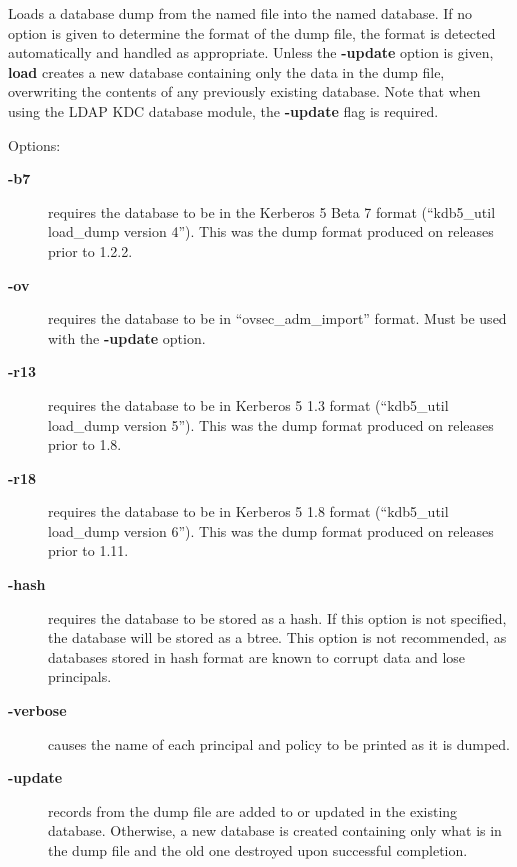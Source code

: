 \documentclass[letterpaper,10pt,english]{sphinxmanual}
\begin{document}
Loads a database dump from the named file into the named database.  If
no option is given to determine the format of the dump file, the
format is detected automatically and handled as appropriate.  Unless
the \textbf{-update} option is given, \textbf{load} creates a new database
containing only the data in the dump file, overwriting the contents of
any previously existing database.  Note that when using the LDAP KDC
database module, the \textbf{-update} flag is required.

Options:
\begin{description}
\item[{\textbf{-b7}}] \leavevmode
requires the database to be in the Kerberos 5 Beta 7 format
(``kdb5\_util load\_dump version 4'').  This was the dump format
produced on releases prior to 1.2.2.

\item[{\textbf{-ov}}] \leavevmode
requires the database to be in ``ovsec\_adm\_import'' format.  Must be
used with the \textbf{-update} option.

\item[{\textbf{-r13}}] \leavevmode
requires the database to be in Kerberos 5 1.3 format (``kdb5\_util
load\_dump version 5'').  This was the dump format produced on
releases prior to 1.8.

\item[{\textbf{-r18}}] \leavevmode
requires the database to be in Kerberos 5 1.8 format (``kdb5\_util
load\_dump version 6'').  This was the dump format produced on
releases prior to 1.11.

\item[{\textbf{-hash}}] \leavevmode
requires the database to be stored as a hash.  If this option is
not specified, the database will be stored as a btree.  This
option is not recommended, as databases stored in hash format are
known to corrupt data and lose principals.

\item[{\textbf{-verbose}}] \leavevmode
causes the name of each principal and policy to be printed as it
is dumped.

\item[{\textbf{-update}}] \leavevmode
records from the dump file are added to or updated in the existing
database.  Otherwise, a new database is created containing only
what is in the dump file and the old one destroyed upon successful
completion.

\end{description}
\end{document}
